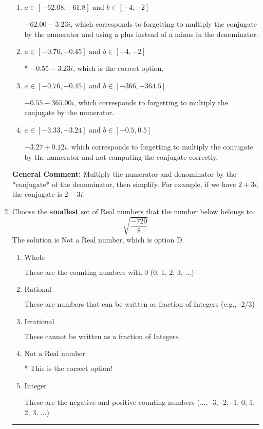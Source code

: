 \documentclass{extbook}[14pt]
\newcommand{\litem}[1]{\item #1

\rule{\textwidth}{0.4pt}}
\begin{document}
\begin{enumerate}
{\begin{enumerate}[label=\Alph*.]
 $-3.38  + 3.14 i$, which corresponds to just dividing the first term by the first term and the second by the second.
\item \( a \in [-62.08, -61.8] \text{ and } b \in [-4, -2] \)

 $-62.00  - 3.23 i$, which corresponds to forgetting to multiply the conjugate by the numerator and using a plus instead of a minus in the denominator.
\item \( a \in [-0.76, -0.45] \text{ and } b \in [-4, -2] \)

* $-0.55  - 3.23 i$, which is the correct option.
\item \( a \in [-0.76, -0.45] \text{ and } b \in [-366, -364.5] \)

 $-0.55  - 365.00 i$, which corresponds to forgetting to multiply the conjugate by the numerator.
\item \( a \in [-3.33, -3.24] \text{ and } b \in [-0.5, 0.5] \)

 $-3.27  + 0.12 i$, which corresponds to forgetting to multiply the conjugate by the numerator and not computing the conjugate correctly.
\end{enumerate}

\textbf{General Comment:} Multiply the numerator and denominator by the *conjugate* of the denominator, then simplify. For example, if we have $2+3i$, the conjugate is $2-3i$.
}
\litem{
Choose the \textbf{smallest} set of Real numbers that the number below belongs to.
\[ \sqrt{\frac{-720}{8}} \]The solution is \( \text{Not a Real number} \), which is option D.\begin{enumerate}[label=\Alph*.]
\item \( \text{Whole} \)

These are the counting numbers with 0 (0, 1, 2, 3, ...)
\item \( \text{Rational} \)

These are numbers that can be written as fraction of Integers (e.g., -2/3)
\item \( \text{Irrational} \)

These cannot be written as a fraction of Integers.
\item \( \text{Not a Real number} \)

* This is the correct option!
\item \( \text{Integer} \)

These are the negative and positive counting numbers (..., -3, -2, -1, 0, 1, 2, 3, ...)
\end{enumerate}

}
\end{enumerate}
\end{document}
